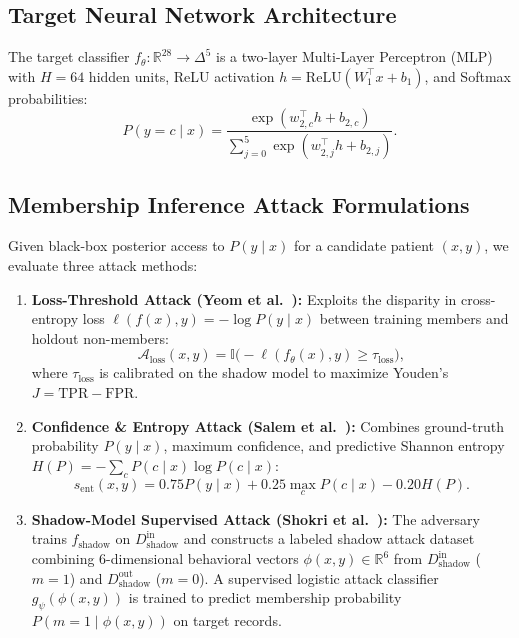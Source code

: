 \documentclass[10pt,twocolumn]{article}
\begin{document}
\subsection{Target Neural Network Architecture}
The target classifier $f_{\theta}: \mathbb{R}^{28} \to \Delta^5$ is a two-layer Multi-Layer Perceptron (MLP) with $H=64$ hidden units, ReLU activation $h = \text{ReLU}(W_1^\top x + b_1)$, and Softmax probabilities:
\begin{equation}
    P(y=c \mid x) = \frac{\exp(w_{2,c}^\top h + b_{2,c})}{\sum_{j=0}^{5} \exp(w_{2,j}^\top h + b_{2,j})}.
\end{equation}

\subsection{Membership Inference Attack Formulations}
Given black-box posterior access to $P(y \mid x)$ for a candidate patient $(x, y)$, we evaluate three attack methods:
\begin{enumerate}
    \item \textbf{Loss-Threshold Attack (Yeom et al.~\cite{yeom2018privacy}):} Exploits the disparity in cross-entropy loss $\ell(f(x), y) = -\log P(y \mid x)$ between training members and holdout non-members:
    \begin{equation}
        \mathcal{A}_{\text{loss}}(x, y) = \mathbb{I}\big(-\ell(f_{\theta}(x), y) \ge \tau_{\text{loss}}\big),
    \end{equation}
    where $\tau_{\text{loss}}$ is calibrated on the shadow model to maximize Youden's $J = \text{TPR} - \text{FPR}$.
    \item \textbf{Confidence \& Entropy Attack (Salem et al.~\cite{salem2019ml}):} Combines ground-truth probability $P(y\mid x)$, maximum confidence, and predictive Shannon entropy $H(P) = -\sum_c P(c\mid x)\log P(c\mid x)$:
    \begin{equation}
        s_{\text{ent}}(x,y) = 0.75 P(y\mid x) + 0.25 \max_c P(c\mid x) - 0.20 H(P).
    \end{equation}
    \item \textbf{Shadow-Model Supervised Attack (Shokri et al.~\cite{shokri2017membership}):} The adversary trains $f_{\text{shadow}}$ on $D_{\text{shadow}}^{\text{in}}$ and constructs a labeled shadow attack dataset combining 6-dimensional behavioral vectors $\phi(x, y) \in \mathbb{R}^6$ from $D_{\text{shadow}}^{\text{in}}$ ($m=1$) and $D_{\text{shadow}}^{\text{out}}$ ($m=0$). A supervised logistic attack classifier $g_{\psi}(\phi(x,y))$ is trained to predict membership probability $P(m=1 \mid \phi(x,y))$ on target records.
\end{enumerate}
\end{document}
